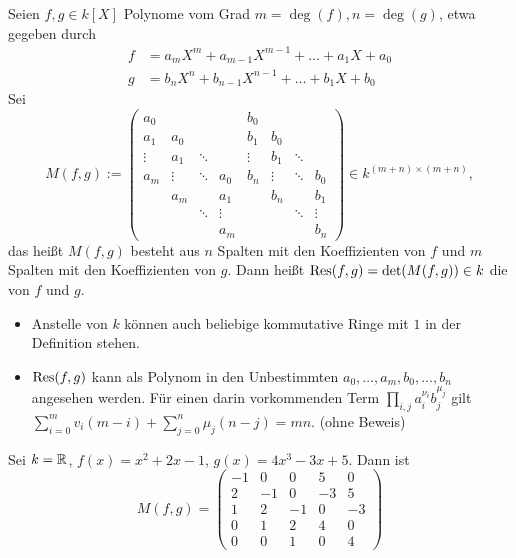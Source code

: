 \begin{defn}[Resultante]
\label{def_10.5}
	Seien $f,g \in k[X]$ Polynome vom Grad $m = \deg(f), n=\deg(g)$, etwa gegeben durch
	\begin{equation}
	\begin{aligned}
		f &= a_mX^m + a_{m-1}X^{m-1} + \dots + a_1X + a_0 \\
		g &= b_nX^n + b_{n-1}X^{n-1} + \dots + b_1X + b_0
	\end{aligned}
	\end{equation}
	Sei
	\[ M(f,g) := \begin{pmatrix}
	a_0 &  &  &  & b_0 &  &  &  \\ 
	a_1 & a_0 &  &  & b_1 & b_0 &  &  \\ 
	\vdots & a_1 & \ddots &  & \vdots & b_1 & \ddots &  \\ 
	a_m & \vdots & \ddots & a_0 & b_n & \vdots & \ddots & b_0 \\ 
	 & a_m &  & a_1 &  & b_n &  & b_1 \\ 
	 &  & \ddots & \vdots &  &  & \ddots & \vdots \\ 
	 &  &  & a_m &  &  &  & b_n
	\end{pmatrix} \in k^{(m+n) \times (m+n)},\]
	das heißt $M(f,g)$ besteht aus $n$ Spalten mit den Koeffizienten von $f$ und $m$ Spalten mit den Koeffizienten von $g$. 
	Dann heißt $\operatorname{Res}(f,g) = \det(M(f,g)) \in k$ die  von $f$ und $g$.
\end{defn}

\begin{bem}
\label{bem_10.6}
	\begin{itemize}
		\item Anstelle von $k$ können auch beliebige kommutative Ringe mit $1$ in der Definition stehen.
		\item $\operatorname{Res}(f,g)$ kann als Polynom in den Unbestimmten $a_0,\dots,a_m, b_0, \dots, b_n$ angesehen werden. 
		Für einen darin vorkommenden Term $\prod_{i,j} a_i^{\nu_i} b_j^{\mu_j}$ gilt $\sum_{i=0}^{m} v_i (m-i) + \sum_{j=0}^{n} \mu_j (n-j) = mn$. 
		(ohne Beweis)
	\end{itemize}
\end{bem}

\begin{bsp}
	Sei $k = \mathbb{R}$, $f(x) = x^2+2x-1$, $g(x) = 4x^3 - 3x + 5$. 
	Dann ist
	\[
		M(f,g) = \begin{pmatrix}
		-1 & 0 & 0 & 5 & 0 \\ 
		2 & -1 & 0 & -3 & 5 \\ 
		1 & 2 & -1 & 0 & -3 \\ 
		0 & 1 & 2 & 4 & 0 \\ 
		0 & 0 & 1 & 0 & 4
		\end{pmatrix} 
	\]
\end{bsp}

